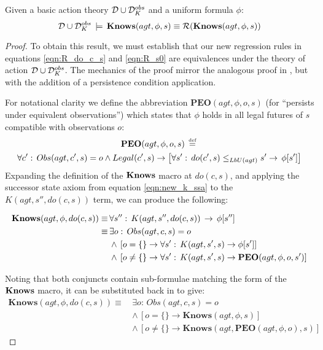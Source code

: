 \begin{thmext}
[\ref{thm:Reg_Knows}] Given a basic action theory $\mathcal{D}\cup\mathcal{D}_{K}^{obs}$
and a uniform formula $\phi$:\[
\mathcal{D}\cup\mathcal{D}_{K}^{obs}\,\models\,\mathbf{Knows}(agt,\phi,s)\equiv\mathcal{R}(\mathbf{Knows}(agt,\phi,s))\]

\end{thmext}
\begin{proof}
To obtain this result, we must establish that our new regression rules
in equations \eqref{eqn:R_do_c_s} and \eqref{eqn:R_s0} are equivalences
under the theory of action $\mathcal{D}\cup\mathcal{D}_{K}^{obs}$. The mechanics
of the proof mirror the analogous proof in \citep{scherl03sc_knowledge},
but with the addition of a persistence condition application.

For notational clarity we define the abbreviation $\mathbf{PEO}(agt,\phi,o,s)$
(for {}``persists under equivalent observations'') which states
that $\phi$ holds in all legal futures of $s$ compatible with observations
$o$:\begin{multline*}
\mathbf{PEO}(agt,\phi,o,s)\,\stackrel{\mbox{\tiny def}}{=}\,\\
\forall c':\, Obs(agt,c',s)=o\wedge Legal(c',s)\rightarrow\left[\forall s':\, do(c',s)\leq_{LbU(agt)}s'\rightarrow\,\phi[s']\right]\end{multline*}
 Expanding the definition of the $\mathbf{Knows}$ macro at $do(c,s)$, and
applying the successor state axiom from equation \eqref{eqn:new_k_ssa}
to the $K(agt,s'',do(c,s))$ term, we can produce the following:

\begin{align*}
\mathbf{Knows}(agt,\phi,do(c,s))\equiv\, & \forall s'':\, K(agt,s'',do(c,s))\,\rightarrow\,\phi[s'']\\
\equiv\, & \exists o:\, Obs(agt,c,s)=o\\
 & \wedge\,\left[o=\{\}\rightarrow\forall s':\, K(agt,s',s)\rightarrow\phi[s']\right]\\
 & \wedge\,\left[o\neq\{\}\rightarrow\forall s':\, K(agt,s',s)\rightarrow\mathbf{PEO}(agt,\phi,o,s')\right]\end{align*}


Noting that both conjuncts contain sub-formulae matching the form
of the $\mathbf{Knows}$ macro, it can be substituted back in to give:\begin{align*}
\mathbf{Knows}(agt,\phi,do(c,s))\equiv\, & \exists o:\, Obs(agt,c,s)=o\\
 & \wedge\,\left[o=\{\}\rightarrow\mathbf{Knows}(agt,\phi,s)\right]\\
 & \wedge\,\left[o\neq\{\}\rightarrow\mathbf{Knows}(agt,\mathbf{PEO}(agt,\phi,o),s)\right]\end{align*}



\end{proof}
